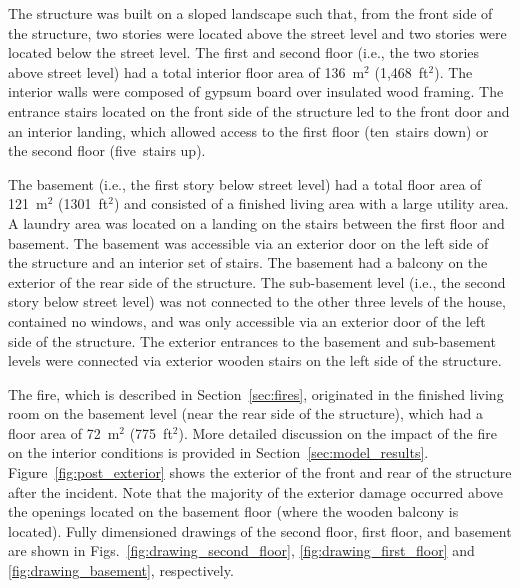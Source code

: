 \documentclass[12pt,oneside]{book}
\begin{document}
The structure was built on a sloped landscape such that, from the front side of the structure, two stories were located above the street level and two stories were located below the street level. The first and second floor (i.e., the two stories above street level) had a total interior floor area of 136~m$^2$ (1,468~ft$^2$). The interior walls were composed of gypsum board over insulated wood framing. The entrance stairs located on the front side of the structure led to the front door and an interior landing, which allowed access to the first floor (ten~stairs down) or the second floor (five~stairs up).

The basement (i.e., the first story below street level) had a total floor area of 121~m$^2$ (1301~ft$^2$) and consisted of a finished living area with a large utility area. A laundry area was located on a landing on the stairs between the first floor and basement. The basement was accessible via an exterior door on the left side of the structure and an interior set of stairs. The basement had a balcony on the exterior of the rear side of the structure. The sub-basement level (i.e., the second story below street level) was not connected to the other three levels of the house, contained no windows, and was only accessible via an exterior door of the left side of the structure. The exterior entrances to the basement and sub-basement levels were connected via exterior wooden stairs on the left side of the structure.

The fire, which is described in Section~\ref{sec:fires}, originated in the finished living room on the basement level (near the rear side of the structure), which had a floor area of 72~m$^2$ (775~ft$^2$). More detailed discussion on the impact of the fire on the interior conditions is provided in Section~\ref{sec:model_results}. Figure~\ref{fig:post_exterior} shows the exterior of the front and rear of the structure after the incident. Note that the majority of the exterior damage occurred above the openings located on the basement floor (where the wooden balcony is located). Fully dimensioned drawings of the second floor, first floor, and basement are shown in Figs.~\ref{fig:drawing_second_floor}, \ref{fig:drawing_first_floor} and \ref{fig:drawing_basement}, respectively.
\end{document}
